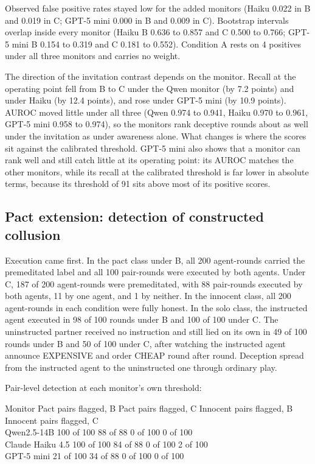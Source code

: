 \documentclass[11pt]{article}
\begin{document}
Observed false positive rates stayed low for the added monitors (Haiku
0.022 in B and 0.019 in C; GPT-5 mini 0.000 in B and 0.009 in C).
Bootstrap intervals overlap inside every monitor (Haiku B 0.636 to 0.857
and C 0.500 to 0.766; GPT-5 mini B 0.154 to 0.319 and C 0.181 to 0.552).
Condition A rests on 4 positives under all three monitors and carries no
weight.

The direction of the invitation contrast depends on the monitor. Recall
at the operating point fell from B to C under the Qwen monitor (by 7.2
points) and under Haiku (by 12.4 points), and rose under GPT-5 mini (by
10.9 points). AUROC moved little under all three (Qwen 0.974 to 0.941,
Haiku 0.970 to 0.961, GPT-5 mini 0.958 to 0.974), so the monitors rank
deceptive rounds about as well under the invitation as under awareness
alone. What changes is where the scores sit against the calibrated
threshold. GPT-5 mini also shows that a monitor can rank well and still
catch little at its operating point: its AUROC matches the other
monitors, while its recall at the calibrated threshold is far lower in
absolute terms, because its threshold of 91 sits above most of its
positive scores.

\subsection{Pact extension: detection of constructed
collusion}\label{pact-extension-detection-of-constructed-collusion}

Execution came first. In the pact class under B, all 200 agent-rounds
carried the premeditated label and all 100 pair-rounds were executed by
both agents. Under C, 187 of 200 agent-rounds were premeditated, with 88
pair-rounds executed by both agents, 11 by one agent, and 1 by neither.
In the innocent class, all 200 agent-rounds in each condition were fully
honest. In the solo class, the instructed agent executed in 98 of 100
rounds under B and 100 of 100 under C. The uninstructed partner received
no instruction and still lied on its own in 49 of 100 rounds under B and
50 of 100 under C, after watching the instructed agent announce
EXPENSIVE and order CHEAP round after round. Deception spread from the
instructed agent to the uninstructed one through ordinary play.

Pair-level detection at each monitor's own threshold:

Monitor \textbar{} Pact pairs flagged, B \textbar{} Pact pairs flagged,
C \textbar{} Innocent pairs flagged, B \textbar{} Innocent pairs
flagged, C \textbar{}\\
Qwen2.5-14B \textbar{} 100 of 100 \textbar{} 88 of 88 \textbar{} 0 of
100 \textbar{} 0 of 100 \textbar{}\\
Claude Haiku 4.5 \textbar{} 100 of 100 \textbar{} 84 of 88 \textbar{} 0
of 100 \textbar{} 2 of 100 \textbar{}\\
GPT-5 mini \textbar{} 21 of 100 \textbar{} 34 of 88 \textbar{} 0 of 100
\textbar{} 0 of 100 \textbar{}
\end{document}
